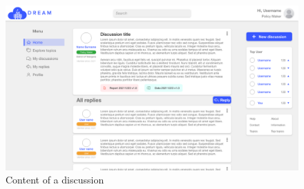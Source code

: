 \begin{figure}[h!]
    \centering
    \includegraphics[scale=0.2]{images/interfaces/discussion.png}
    \caption{Content of a discussion}
    \label{fig:forum_post}
\end{figure}
\FloatBarrier
